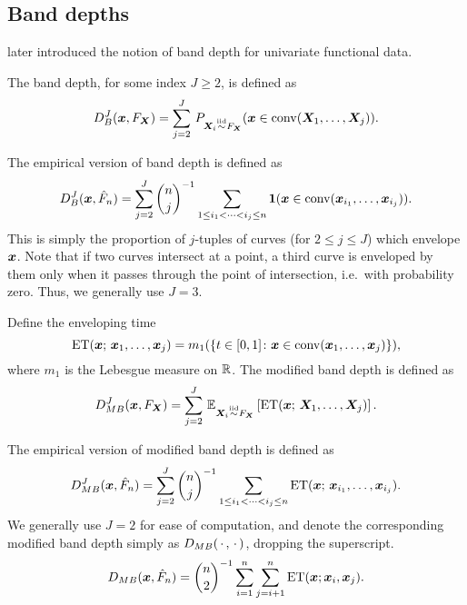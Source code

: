 \subsection{Band depths}

\textcite{pintado-romo-2009} later introduced the notion of band depth for
univariate functional data.

\begin{definition}
    The band depth, for some index $J \geq 2$, is defined as
    \begin{equation}
        D_B^J(\bm{x}, F_{\bm{X}}) = \sum_{j = 2}^J\, P_{\bm{X}_i \overset{\text{iid}}{\sim} F_{\bm{X}}}(\bm{x} \in \operatorname{conv}(\bm{X}_1, \dots, \bm{X}_j)).
    \end{equation}
\end{definition}
The empirical version of band depth is defined as
\begin{equation}
    D_B^J(\bm{x}, \hat{F}_n) = \sum_{j = 2}^J\binom{n}{j}^{-1} \sum_{\substack{1 \leq i_1 < \dots < i_j \leq n}} \bm{1}(\bm{x} \in \operatorname{conv}(\bm{x}_{i_1}, \dots, \bm{x}_{i_j})).
\end{equation}
This is simply the proportion of $j$-tuples of curves (for $2 \leq j \leq J$)
which envelope $\bm{x}$.
Note that if two curves intersect at a point, a third curve is enveloped by
them only when it passes through the point of intersection, i.e.\ with
probability zero.
Thus, we generally use $J = 3$.


\begin{definition}
    Define the enveloping time
    \begin{equation}
        \operatorname{ET}(\bm{x};\, \bm{x}_1, \dots, \bm{x}_j) = m_1(\{t \in [0, 1]\colon \bm{x} \in \operatorname{conv}(\bm{x}_1, \dots, \bm{x}_j)\}),
    \end{equation}
    where $m_1$ is the Lebesgue measure on $\mathbb{R}$.
    The modified band depth is defined as
    \begin{equation}
        D_{MB}^J(\bm{x}, F_{\bm{X}}) = \sum_{j = 2}^J\, \operatorname{\mathbb{E}}_{\bm{X}_i \overset{\text{iid}}{\sim} F_{\bm{X}}}\left[ \operatorname{ET}(\bm{x};\, \bm{X}_1, \dots, \bm{X}_j)\right].
    \end{equation}
\end{definition}
The empirical version of modified band depth is defined as
\begin{equation}
    D_{MB}^J(\bm{x}, \hat{F}_n) = \sum_{j = 2}^J\binom{n}{j}^{-1} \sum_{\substack{1 \leq i_1 < \dots < i_j \leq n}} \operatorname{ET}(\bm{x};\, \bm{x}_{i_1}, \dots, \bm{x}_{i_j}).
\end{equation}
We generally use $J = 2$ for ease of computation, and denote the corresponding
modified band depth simply as $D_{MB}(\,\cdot\,, \,\cdot\,)$, dropping the
superscript.
\begin{equation}
    D_{MB}(\bm{x}, \hat{F}_n) = \binom{n}{2}^{-1}\sum_{i = 1}^n\sum_{j = i + 1}^n \operatorname{ET}(\bm{x}; \bm{x}_i, \bm{x}_j).
\end{equation}



